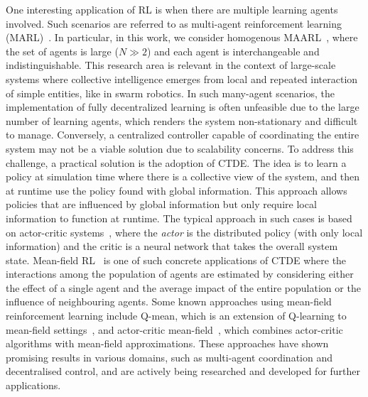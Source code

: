 \documentclass[conference]{IEEEtran}
\begin{document}
One interesting application of \ac{RL} is when there are multiple learning agents involved. 
 Such scenarios are referred to as multi-agent reinforcement learning (MARL)~\cite{zhang2019marl}. 
%
In particular, in this work, we consider homogenous \ac{MAARL}~\cite{yang2021many}, 
 where the set of agents is large ($N \gg 2$) and each agent is interchangeable and indistinguishable.
%
This research area is relevant in the context of large-scale systems 
 where collective intelligence emerges from local and repeated interaction of simple entities, like in swarm robotics.
%
In such many-agent scenarios, 
 the implementation of fully decentralized learning is often unfeasible due to the large number of learning agents, 
 which renders the system non-stationary and difficult to manage. 
%
Conversely, a centralized controller capable of coordinating 
 the entire system may not be a viable solution due to scalability concerns. 
 To address this challenge, a practical solution is the adoption of \ac{CTDE}.
%
The idea is to learn a policy at simulation time where there is a collective view of the system, 
 and then at runtime use the policy found with global information. 
This approach allows policies that are influenced by global information but only require local information to function at runtime. 
%
The typical approach in such cases is based on actor-critic systems~\cite{DBLP:conf/nips/LoweWTHAM17,wu2022more,song2022ctds,song2022centralized},
  where the \emph{actor} is the distributed policy (with only local information) and the critic is a neural network that takes the overall system state.
%
Mean-field RL~\cite{pmlr-v80-yang18d} is one of such concrete applications of \ac{CTDE} 
 where the interactions among the population of agents are estimated by considering either the effect of a single agent and the average impact of the entire population or the influence of neighbouring agents.
%
Some known approaches using mean-field reinforcement learning include Q-mean, 
 which is an extension of Q-learning to mean-field settings~\cite{yang2018mean}, 
 and actor-critic mean-field~\cite{frikha2023actor}, which combines actor-critic algorithms with mean-field approximations. 
%
These approaches have shown promising results in various domains, such as multi-agent coordination 
 and decentralised control, and are actively being researched and developed for further applications.
\end{document}

